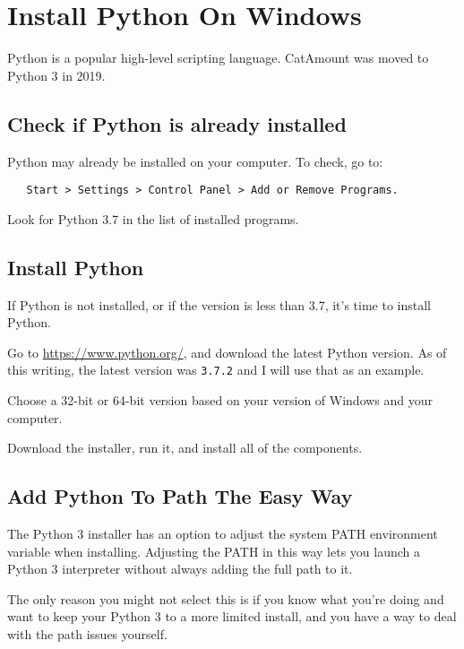 \chapter{Install Python On Windows}
\hypertarget{windows-install-python}{}

Python is a popular high-level scripting language. CatAmount was
moved to Python 3 in 2019.

\section{Check if Python is already installed}

Python may already be installed on your computer. To check, go
to:

\begin{verbatim}
   Start > Settings > Control Panel > Add or Remove Programs.
\end{verbatim}

Look for Python 3.7 in the list of installed programs.


\section{Install Python}

If Python is not installed, or if the version is less than 3.7,
it's time to install Python.

Go to \url{https://www.python.org/}, and download the latest
Python version. As of this writing, the latest version was \verb=3.7.2=
and I will use that as an example.

Choose a 32-bit or 64-bit version based on your version of Windows
and your computer.

Download the installer, run it, and install all of the components.


\section{Add Python To Path The Easy Way}

The Python 3 installer has an option to adjust the system PATH
environment variable when installing. Adjusting the PATH in this
way lets you launch a Python 3 interpreter without always adding
the full path to it.

The only reason you might not select this is if you know what
you're doing and want to keep your Python 3 to a more limited install,
and you have a way to deal with the path issues yourself.


